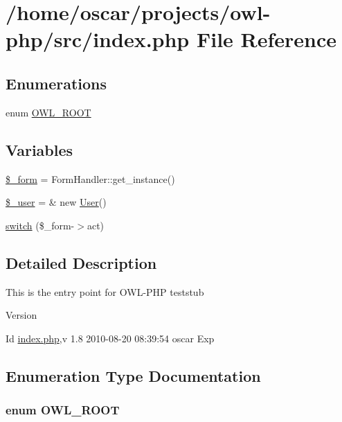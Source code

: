 \section{/home/oscar/projects/owl-\/php/src/index.php File Reference}
\label{index_8php}
\subsection*{Enumerations}
\begin{DoxyCompactItemize}
\item 
enum \hyperlink{index_8php_a35612f9a6bd7277982731a74593272c4}{OWL\_\-ROOT} 
\end{DoxyCompactItemize}
\subsection*{Variables}
\begin{DoxyCompactItemize}
\item 
\hyperlink{index_8php_ab14b242803551e0f269742a7103f149d}{\$\_\-form} = FormHandler::get\_\-instance()
\item 
\hyperlink{index_8php_a5df5982b9dadc74df05081972cd67fdf}{\$\_\-user} = \& new \hyperlink{classUser}{User}()
\item 
\hyperlink{index_8php_a52f05478bd75c12464168eb5bed6d57d}{switch} (\$\_\-form-\/$>$act)
\end{DoxyCompactItemize}


\subsection{Detailed Description}
This is the entry point for OWL-\/PHP teststub \begin{DoxyVersion}{Version}

\end{DoxyVersion}
\begin{DoxyParagraph}{Id}
\hyperlink{index_8php}{index.php},v 1.8 2010-\/08-\/20 08:39:54 oscar Exp 
\end{DoxyParagraph}


\subsection{Enumeration Type Documentation}
\subsubsection[{OWL\_\-ROOT}]{\setlength{\rightskip}{0pt plus 5cm}enum {\bf OWL\_\-ROOT}}\label{index_8php_a35612f9a6bd7277982731a74593272c4}



